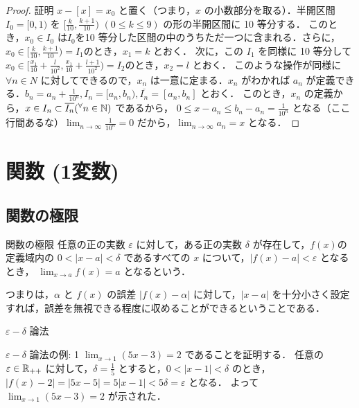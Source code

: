 \documentclass[a4paper]{ltjsarticle}
\begin{document}
  \begin{proof}{証明}{}
   $x - [x] = x_0$ と置く（つまり，$x$ の小数部分を取る）．半開区間 $I_0 = [0, 1)$ を $[\frac{k}{10},\frac{k + 1}{10})$ \hspace{10pt} $(0 \leq k \leq 9)$ の形の半開区間に 10 等分する．
   このとき，$x_0 \in I_0$ は$I_0$を10 等分した区間の中のうちただ一つに含まれる．さらに，$x_0 \in [\frac{k}{10}, \frac{k + 1}{10}) = I_1 のとき，x_1 = k$ とおく．
   次に，この $I_1$ を同様に 10 等分して $x_0 \in [\frac{x_1}{10} + \frac{l}{10^2}, \frac{x_1}{10} + \frac{l + 1}{10^2}) = I_2 のとき，x_2 = l$ とおく．
   このような操作が同様に $\forall n \in N$ に対してできるので，$x_n$ は一意に定まる．$x_n$ がわかれば $a_n$ が定義できる．$b_n = a_n + \frac{1}{10^n}, I_n = [a_n, b_n), \overline{I_n} = [a_n, b_n]$ とおく．
   このとき，$x_n$ の定義から，$x \in I_n \subset \overline{I_n} (\forall n \in \N)$ であるから，
   $0 \leq x - a_n \leq b_n - a_n = \frac{1}{10^n}$ となる（ここ行間あるな）$\displaystyle \lim_{n \to \infty} \frac{1}{10^n} = 0$ だから，$\displaystyle \lim_{n \to \infty} a_n = x$ となる．
  \end{proof}

 \section{関数 (1変数)}
  \subsection{関数の極限}
  \begin{tcb}{関数の極限}{}
    任意の正の実数 $\varepsilon$ に対して，ある正の実数 $\delta$ が存在して，$f(x)$の定義域内の $0 < |x-a| < \delta$ であるすべての $x$ について，$|f(x) - a| < \varepsilon$ となるとき，
    $\displaystyle \lim_{x \to a} f(x) = a$ となるという．
  \end{tcb}
  つまりは，$\alpha$ と $f(x)$ の誤差 $|f(x) - \alpha|$ に対して，$|x-a|$ を十分小さく設定すれば，誤差を無視できる程度に収めることができるということである．

  \begin{tcb}{$\varepsilon-\delta$ 論法}{}
    
  \end{tcb}

  \begin{tcb}{$\varepsilon - \delta$ 論法の例: 1}{}
    $\displaystyle \lim_{x \to 1} (5x-3) = 2$ であることを証明する．
    任意の $\varepsilon \in \mathbb{R}_{++}$ に対して，$\delta = \frac{1}{5}$ とすると，$0 < |x - 1| < \delta$ のとき，$|f(x) - 2| = |5x-5| = 5|x-1| < 5\delta = \varepsilon$ となる．
    よって $\displaystyle \lim_{x \to 1} (5x-3) = 2$ が示された．
    
  \end{tcb}
\end{document}
